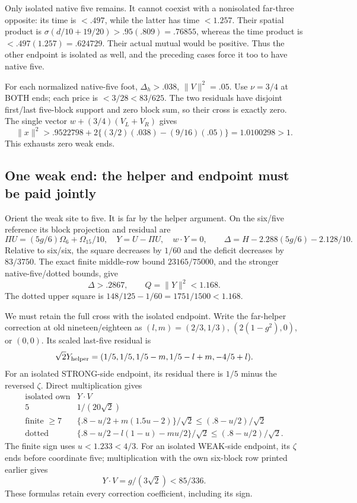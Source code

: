 \documentclass[11pt]{article}
\theoremstyle{definition}
\theoremstyle{remark}
\begin{document}
Only isolated native five remains.
It cannot coexist with a nonisolated
far-three opposite: its time is
\(<.497\), while the latter has
time \(<1.257\).
Their spatial product is
\(\sigma(d/10+19/20)>.95(.809)=.76855\),
whereas the time product is
\(<.497(1.257)=.624729\).
Their actual mutual would be
positive.
Thus the other endpoint is isolated
as well, and the preceding cases
force it too to have native five.

For each normalized native-five foot,
\(\Delta_h>.038\), \(\|V\|^2=.05\).
Use \(\nu=3/4\) at BOTH ends;
each price is \(<3/28<83/625\).
The two residuals have disjoint
first/last five-block support and
zero block sum, so their cross
is exactly zero.
The single vector
\(w+(3/4)(V_L+V_R)\) gives
\[
 \|x\|^2>.9522798+
       2\{(3/2)(.038)-(9/16)(.05)\}
                       =1.0100298>1 .
\]
This exhausts zero weak ends.

\subsection{One weak end: the helper and endpoint must be paid jointly}
\label{app:exact19:Aoneweak}

Orient the weak site to five.
It is far by the helper argument.
On the six/five reference its
block projection and residual are
\[
 \Pi U=(5g/6)\Omega_6+\Omega_{15}/10,\quad
 Y=U-\Pi U,\quad w\cdot Y=0,
 \qquad\Delta=H-2.288(5g/6)-2.128/10 .
\]
Relative to six/six,
the square decreases by \(1/60\)
and the deficit decreases by
\(83/3750\).
The exact finite middle-row bound
\(23165/75000\), and the stronger
native-five/dotted bounds, give
\[
                       \Delta>.2867,\qquad Q=\|Y\|^2<1.168 .
\]
The dotted upper square is
\(148/125-1/60=1751/1500<1.168\).

We must retain the full cross with
the isolated endpoint.
Write the far-helper correction
at old nineteen/eighteen as
\((l,m)=(2/3,1/3)\),
\((2(1-g^2),0)\), or \((0,0)\).
Its scaled last-five residual is
\[
             \sqrt2Y_{\rm helper}
               =(1/5,1/5,1/5-m,1/5-l+m,-4/5+l).
\]
For an isolated STRONG-side endpoint,
its residual there is \(1/5\)
minus the reversed \(\zeta\).
Direct multiplication gives
\[
\begin{array}{c|c}
 \text{isolated own}&Y\cdot V\\ \hline
 5&1/(20\sqrt2)\\
 \text{finite }\ge7&
       \{.8-u/2+m(1.5u-2)\}/\sqrt2\le(.8-u/2)/\sqrt2\\
 \text{dotted}&
       \{.8-u/2-l(1-u)-mu/2\}/\sqrt2\le(.8-u/2)/\sqrt2 .
\end{array}
\]
The finite sign uses \(u<1.233<4/3\).
For an isolated WEAK-side endpoint,
its \(\zeta\) ends before coordinate
five; multiplication with the own
six-block row printed earlier gives
\[
                             Y\cdot V=g/(3\sqrt2)<85/336 .
\]
These formulas retain every correction
coefficient, including its sign.
\end{document}
